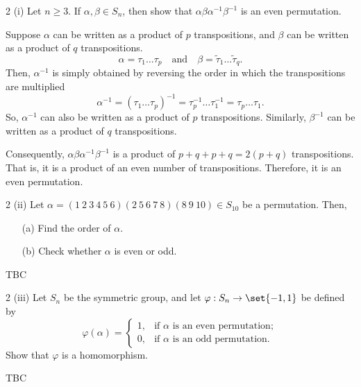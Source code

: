 \documentclass[11pt]{penrose}
\begin{document}
\begin{problem}{2 (i)}
    Let $n \geq 3$. If $\alpha, \beta \in S_n$, then show that $\alpha\beta\alpha^{-1}\beta^{-1}$ is an even permutation.

    \solution Suppose $\alpha$ can be written as a product of $p$ transpositions, and $\beta$ can be written as a product of $q$ transpositions.
    \begin{equation*}
        \alpha
        = \tau_1 \dots \tau_p
        \quad\text{and}\quad
        \beta
        = \tilde{\tau}_1 \dots \tilde{\tau}_q.
    \end{equation*}
    Then, $\alpha^{-1}$ is simply obtained by reversing the order in which the transpositions are multiplied
    \begin{equation*}
        \alpha^{-1}
        = (\tau_1 \dots \tau_p)^{-1}
        = \tau_p^{-1} \dots \tau_1^{-1}
        = \tau_p \dots \tau_1.
    \end{equation*}
    So, $\alpha^{-1}$ can also be written as a product of $p$ transpositions. Similarly, $\beta^{-1}$ can be written as a product of $q$ transpositions.

    Consequently, $\alpha\beta\alpha^{-1}\beta^{-1}$ is a product of $p+q+p+q = 2(p+q)$ transpositions. That is, it is a product of an even number of transpositions. Therefore, it is an even permutation.
\end{problem}

\begin{problem}{2 (ii)}
    Let $\alpha = (1\ 2\ 3\ 4\ 5\ 6)(2\ 5\ 6\ 7\ 8)(8\ 9\ 10) \in S_{10}$ be a permutation. Then,
    \begin{enumerate}
        \item[(a)] Find the order of $\alpha$.
        \item[(b)] Check whether $\alpha$ is even or odd.
    \end{enumerate}

    \solution TBC
\end{problem}

\begin{problem}{2 (iii)}
    Let $S_n$ be the symmetric group, and let $\varphi: S_n \to \set{-1,1}$ be defined by
    \begin{equation*}
    \varphi(\alpha) =
    \begin{cases}
        1, & \text{if } \alpha \text{ is an even permutation};\\
        0, & \text{if } \alpha \text{ is an odd permutation}.
    \end{cases}
    \end{equation*}
    Show that $\varphi$ is a homomorphism.

    \solution TBC
\end{problem}
\end{document}
